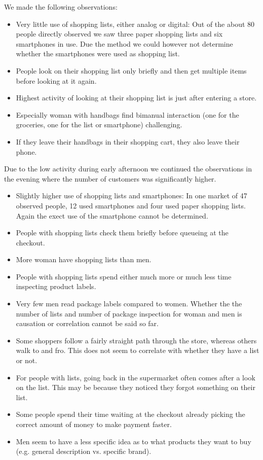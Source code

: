 \documentclass{scrartcl}
\begin{document}
      We made the following observations:
      \begin{itemize}
        \item Very little use of shopping lists, either analog or digital: Out of the about 80 people directly observed we saw three paper shopping lists and six smartphones in use. Due the method we could however not determine whether the smartphones were used as shopping list.
        \item People look on their shopping list only briefly and then get multiple items before looking at it again.
        \item Highest activity of looking at their shopping list is just after entering a store.
        \item Especially woman with handbags find bimanual interaction (one for the groceries, one for the list or smartphone) challenging.
        \item If they leave their handbags in their shopping cart, they also leave their phone.
      \end{itemize}

      Due to the low activity during early afternoon we continued the observations in the evening where the number of customers was significantly higher.
      \begin{itemize}
        \item Slightly higher use of shopping lists and smartphones: In one market of 47 observed people, 12 used smartphones and four used paper shopping lists. Again the exect use of the smartphone cannot be determined.
        \item People with shopping lists check them briefly before queueing at the checkout.
        \item More woman have shopping lists than men.
        \item People with shopping lists spend either much more or much less time inspecting product labels.
        \item Very few men read package labels compared to women. Whether the the number of lists and number of package inspection for woman and men is causation or correlation cannot be said so far.
        \item Some shoppers follow a fairly straight path through the store, whereas others walk to and fro. This does not seem to correlate with whether they have a list or not.
        \item For people with lists, going back in the supermarket often comes after a look on the list. This may be because they noticed they forgot something on their list.
        \item Some people spend their time waiting at the checkout already picking the correct amount of money to make payment faster.
        \item Men seem to have a less specific idea as to what products they want to buy (e.g. general description vs. specific brand).
      \end{itemize}
\end{document}
